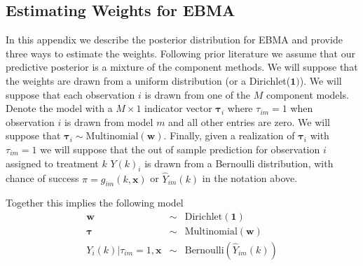 \documentclass[12pt,letterpaper]{article}
\numberwithin{equation}{section}
\numberwithin{equation}{section}
\begin{document}

\subsection{Estimating Weights for EBMA}\label{a:EBMA}
In this appendix we describe the posterior distribution for EBMA and provide three ways to estimate the weights.  Following prior literature \citep{Raftery05, MonHolWar12} we assume that our predictive posterior is a mixture of the component methods.  We will suppose that the weights are drawn from a uniform distribution (or a Dirichlet($\boldsymbol{1})$).  We will suppose that each observation $i$ is drawn from one of the $M$ component models.  Denote the model with a $M \times 1$ indicator vector $\boldsymbol{\tau}_{i}$ where $\tau_{im} = 1$ when observation $i$ is drawn from model $m$ and all other entries are zero.  We will suppose that $\boldsymbol{\tau}_{i} \sim \text{Multinomial}(\boldsymbol{w})$.  Finally, given a realization of $\boldsymbol{\tau}_{i}$ with $\tau_{im} = 1$ we will suppose that the out of sample prediction for observation $i$ assigned to treatment $k$  $Y(k)_{i}$ is drawn from a Bernoulli distribution, with chance of success $\pi = g_{im} (k, \boldsymbol{x})$ or $\widehat{Y}_{im}(k)$ in the notation above.  

Together this implies the following  model 
\begin{eqnarray}
\boldsymbol{w} & \sim  & \text{Dirichlet}(\boldsymbol{1} ) \nonumber \\
\boldsymbol{\tau} & \sim & \text{Multinomial}(\boldsymbol{w} ) \nonumber \\
Y_{i}(k) | \tau_{im} = 1, \boldsymbol{x}  & \sim  & \text{Bernoulli}\left( \widehat{Y}_{im}(k) \right) \nonumber 
\end{eqnarray}
\end{document}
